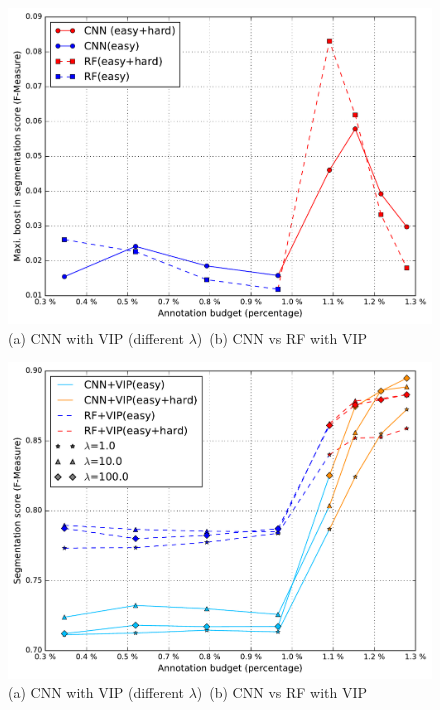 \begin{figure}[h!] \label{fig:cnnvip}
 \includegraphics[width=0.8\linewidth]{figures/cnn_vip_boost.pdf}
\caption{(a) CNN with VIP (different $\lambda$)\, (b) CNN vs RF with VIP}
\end{figure}


\begin{figure}[h!] \label{fig:cnnvip}
 \includegraphics[width=0.8\linewidth]{figures/cnn_vs_rf_vip.pdf} 
\caption{(a) CNN with VIP (different $\lambda$)\, (b) CNN vs RF with VIP}
\end{figure}